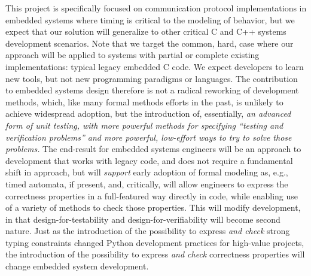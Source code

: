 This project is specifically focused on communication protocol implementations in embedded systems where timing is critical to the modeling of behavior, but we expect that our solution will generalize to other critical C and C++ systems development scenarios.  Note that we target the common, hard, case where our approach will be applied to systems with partial or complete existing implementations: typical legacy embedded C code.  We expect developers to learn new tools, but not new programming paradigms or languages.  The contribution to embedded systems design therefore is not a radical reworking of development methods, which, like many formal methods efforts in the past, is unlikely to achieve widespread adoption, but the introduction of, essentially, \emph{an advanced form of unit testing, with more powerful methods for specifying ``testing and verification problems'' and more powerful, low-effort ways to try to solve those problems.}  The end-result for embedded systems engineers will be an approach to development that works with legacy code, and does not require a fundamental shift in approach, but will \emph{support} early adoption of formal modeling as, e.g., timed automata, if present, and, critically, will allow engineers to express the correctness properties in a full-featured way directly in code, while enabling use of a variety of methods to check those properties.  This will modify development, in that design-for-testability and design-for-verifiability will become second nature.  Just as the introduction of the possibility to express \emph{and check} strong typing constraints changed Python development practices for high-value projects, the introduction of the possibility to express \emph{and check} correctness properties will change embedded system development.

\noindent{}


